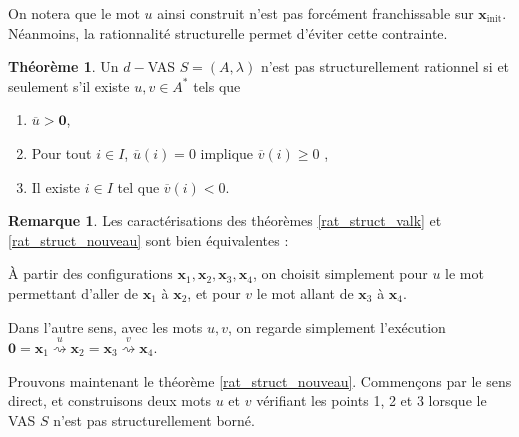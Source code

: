 \documentclass[a4paper,final]{article}
\theoremstyle{definition}
\newtheorem{Theorem}{Théorème}
\newtheorem*{Remark}{Remarque}
\let\geq\geqslant
\newcommand{\alain}[1]{\textcolor{blue}{#1}}
\newcommand{\transZ}[1]{\ensuremath{\stackrel{#1}{\rightsquigarrow}}}
\newcommand{\vect}[1]{\ensuremath{\mathbf{#1}}}
\newcommand{\xinit}{\ensuremath{\vect{x}_\text{init}}}
\newcommand{\valeur}[1]{\ensuremath{\overline{#1}}}
\begin{document}
On notera que le mot $u$ ainsi construit n'est pas forcément franchissable sur $\xinit$.
Néanmoins, la rationnalité structurelle permet d'éviter cette contrainte.

\begin{Theorem}\label{conf_struct_rat}
\label{rat_struct_nouveau}
Un $d-$VAS $S=(A,\lambda)$ n'est pas structurellement rationnel si et seulement s'il existe $u,v\in A^*$ tels que 
\begin{enumerate}
    \item $\valeur{u} > \vect{0}$,
    \item Pour tout $i \in I$, $\valeur{u}(i)=0$ implique $\valeur{v}(i) \geq 0$ ,
    \item Il existe $i\in I$ tel que $\valeur{v}(i) < 0$.
\end{enumerate}
\end{Theorem}

\begin{Remark}
Les caractérisations des théorèmes \ref{rat_struct_valk} et \ref{rat_struct_nouveau} sont bien équivalentes :

\noindent À partir des configurations $\vect{x}_1, \vect{x}_2, \vect{x}_3, \vect{x}_4$, on choisit simplement pour $u$ le mot permettant d'aller de $\vect{x}_1$ à $\vect{x}_2$, et pour $v$ le mot allant de $\vect{x}_3$ à $\vect{x}_4$.

\noindent Dans l'autre sens, avec les mots $u,v$, on regarde simplement l'exécution $\vect{0} = \vect{x}_1 \transZ{u} \vect{x}_2 = \vect{x}_3 \transZ{v} \vect{x}_4$.
\end{Remark}

Prouvons maintenant le théorème \ref{rat_struct_nouveau}.
Commençons par le sens direct, et construisons deux mots $u$ et $v$ vérifiant les points 1, 2 et 3 lorsque le VAS $S$ n'est pas structurellement borné.
\end{document}

